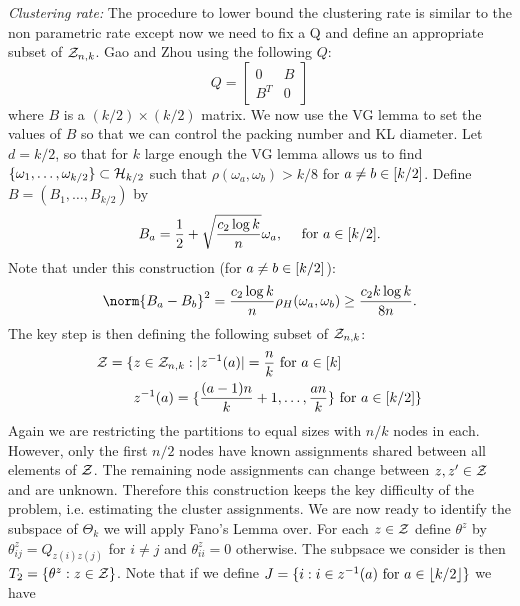 \documentclass[11pt]{article}
\begin{document}
\textit{Clustering rate:} The procedure to lower bound the clustering rate is similar to the non parametric rate except now we need to fix a Q and define an appropriate subset of $\mathcal{Z}_{n,k}$. Gao and Zhou using the following $Q$:
\begin{equation}\label{eq:clusterQ}
Q = \left[
\begin{array}{cc}
0 & B \\
B^T & 0
\end{array}
\right]
\end{equation}
where $B$ is a $(k/2) \times (k/2)$ matrix. We now use the VG lemma to set the values of $B$ so that we can control the packing number and KL diameter. Let $d = k/2$, so that for $k$ large enough the VG lemma allows us to find $\{\omega_1, \dots, \omega_{k/2}\} \subset \mathcal{H}_{k/2}$ such that $\rho(\omega_a, \omega_b) > k/8$ for $a \neq b \in \lbrack k/2\rbrack$. Define $B = (B_1, \dots, B_{k/2})$ by
\begin{equation}
B_a = \frac{1}{2} + \sqrt{\frac{c_2 \log k}{n}}\omega_a, \quad \text{ for } a \in \lbrack k/2\rbrack.
\end{equation}
Note that under this construction (for $a \neq b \in \lbrack k/2\rbrack$):
\begin{equation}
\norm{B_a - B_b}^2 = \frac{c_2 \log k}{n} \rho_H(\omega_a, \omega_b) \geq \frac{c_2 k \log k}{8 n}.
\end{equation}
The key step is then defining the following subset of $\mathcal{Z}_{n,k}$:
\begin{equation}
\begin{aligned}
\mathcal{Z} = \{&z \in \mathcal{Z}_{n,k} : |z^{-1}(a)| = \frac{n}{k} \text{ for } a \in \lbrack k\rbrack \\
          &z^{-1}(a) = \{\frac{(a-1)n}{k} + 1, \dots, \frac{an}{k}\} \text{ for } a \in \lbrack k/2\rbrack\}
\end{aligned}
\end{equation}
Again we are restricting the partitions to equal sizes with $n/k$ nodes in each. However, only the first $n/2$ nodes have known assignments shared between all elements of $\mathcal{Z}$. The remaining node assignments can change between $z, z' \in \mathcal{Z}$ and are unknown. Therefore this construction keeps the key difficulty of the problem, i.e. estimating the cluster assignments. We are now ready to identify the subspace of $\Theta_k$ we will apply Fano's Lemma over. For each $z \in \mathcal{Z}$ define $\theta^{z}$ by $\theta_{ij}^z = Q_{z(i)z(j)}$ for $i \neq j$ and $\theta_{ii}^z = 0$ otherwise. The subpsace we consider is then $T_2 = \{\theta^{z} : z \in \mathcal{Z}\}$. Note that if we define $J = \{i : i \in z^{-1}(a) \text{ for } a \in \lfloor k/2\rfloor\}$ we have
\end{document}
